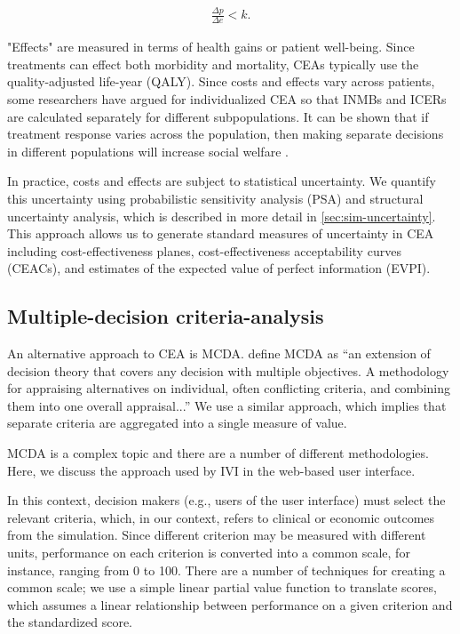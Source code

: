 \documentclass[11pt,final,fleqn]{article}\usepackage[]{graphicx}\usepackage[]{color}
\theoremstyle{plain}
\begin{document}
\begin{align}
\frac{\Delta p}{\Delta e} < k.
\end{align}

"Effects" are measured in terms of health gains or patient well-being. Since treatments can effect both morbidity and mortality, CEAs typically use the quality-adjusted life-year (QALY). Since costs and effects vary across patients, some researchers have argued for individualized CEA \citep{basu2007value, ioannidis2011individualized, espinoza2014value} so that INMBs and ICERs are calculated separately for different subpopulations. It can be shown that if treatment response varies across the population, then making separate decisions in different populations will increase social welfare \citep{basu2007value}.

In practice, costs and effects are subject to statistical uncertainty. We quantify this uncertainty using probabilistic sensitivity analysis (PSA) and structural uncertainty analysis, which is described in more detail in \autoref{sec:sim-uncertainty}. This approach allows us to generate standard measures of uncertainty in CEA including cost-effectiveness planes, cost-effectiveness acceptability curves (CEACs), and estimates of the expected value of perfect information (EVPI).

\subsection{Multiple-decision criteria-analysis}
An alternative approach to CEA is MCDA. \citet{keeney1993decisions} define MCDA as ``an extension of decision theory that covers any decision with multiple objectives. A methodology for appraising alternatives on individual, often conflicting criteria, and combining them into one overall appraisal...'' We use a similar approach, which implies that separate criteria are aggregated into a single measure of value.

MCDA is a complex topic and there are a number of different methodologies. Here, we discuss the approach used by IVI in the web-based user interface.

In this context, decision makers (e.g., users of the user interface) must select the relevant criteria, which, in our context, refers to clinical or economic outcomes from the simulation. Since different criterion may be measured with different units, performance on each criterion is converted into a common scale, for instance, ranging from 0 to 100. There are a number of techniques for creating a common scale; we use a simple linear partial value function to translate scores, which assumes a linear relationship between performance on a given criterion and the standardized score.
\end{document}

